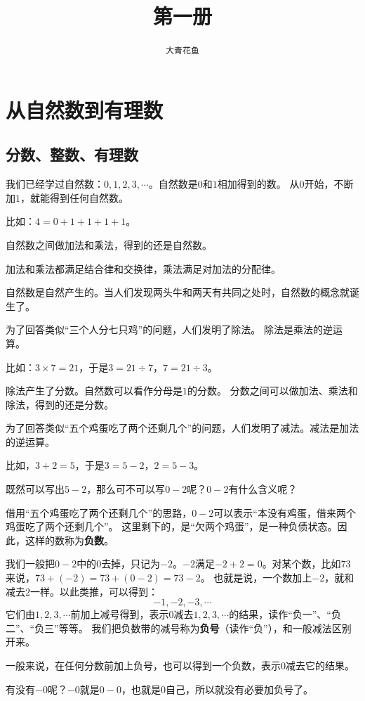 \documentclass[12pt,UTF8]{ctexbook}
\title{\zihao{0} \bfseries 第一册}
\author{\zihao{2} \texttt{大青花鱼}}
\date{}
\begin{document}
\maketitle
\tableofcontents
\newpage

\chapter{从自然数到有理数}

\section{分数、整数、有理数}
我们已经学过自然数：$0,1,2,3,\cdots$。自然数是$0$和$1$相加得到的数。
从$0$开始，不断加$1$，就能得到任何自然数。

比如：$4 = 0 + 1 + 1 + 1 + 1$。

自然数之间做加法和乘法，得到的还是自然数。

加法和乘法都满足结合律和交换律，乘法满足对加法的分配律。

自然数是自然产生的。当人们发现两头牛和两天有共同之处时，自然数的概念就诞生了。

为了回答类似“三个人分七只鸡”的问题，人们发明了除法。
除法是乘法的逆运算。

比如：$3 \times 7 = 21$，于是$3 = 21 \div 7$，$7 = 21 \div 3$。

除法产生了分数。自然数可以看作分母是$1$的分数。
分数之间可以做加法、乘法和除法，得到的还是分数。

为了回答类似“五个鸡蛋吃了两个还剩几个”的问题，人们发明了减法。减法是加法的逆运算。

比如，$3+2=5$，于是$3 = 5 - 2$，$2 = 5 - 3$。

既然可以写出$5-2$，那么可不可以写$0-2$呢？$0-2$有什么含义呢？

借用“五个鸡蛋吃了两个还剩几个”的思路，$0-2$可以表示“本没有鸡蛋，借来两个鸡蛋吃了两个还剩几个”。
这里剩下的，是“欠两个鸡蛋”，是一种负债状态。因此，这样的数称为\textbf{负数}。

我们一般把$0-2$中的$0$去掉，只记为$-2$。$-2$满足$-2+2=0$。对某个数，比如$73$来说，$73+(-2)=73+(0-2)=73-2$。
也就是说，一个数加上$-2$，就和减去$2$一样。以此类推，可以得到：
$$ -1, -2, -3, \cdots $$
它们由$1,2,3,\cdots$前加上减号得到，表示$0$减去$1,2,3,\cdots$的结果，读作“负一”、“负二”、“负三”等等。
我们把负数带的减号称为\textbf{负号}（读作“负”），和一般减法区别开来。

一般来说，在任何分数前加上负号，也可以得到一个负数，表示$0$减去它的结果。

有没有$-0$呢？$-0$就是$0-0$，也就是$0$自己，所以就没有必要加负号了。
\end{document}
